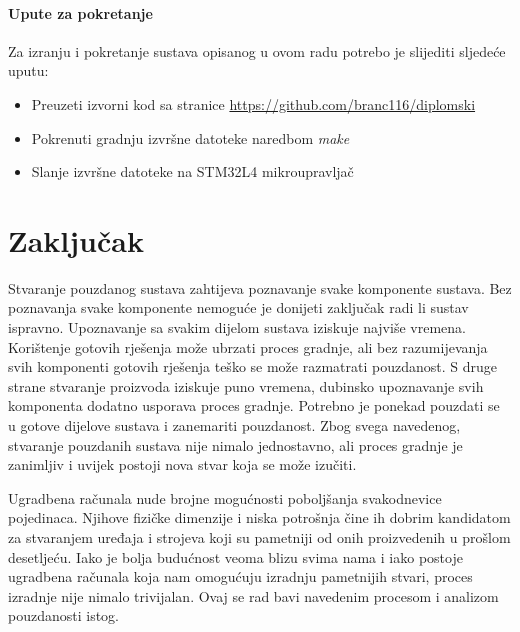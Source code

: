 \documentclass[times, utf8, diplomski]{diplomski}
\begin{document}
\subsubsection{Upute za pokretanje}
Za izranju i pokretanje sustava opisanog u ovom radu potrebo je slijediti sljedeće uputu:

\begin{itemize}
  \item Preuzeti izvorni kod sa stranice \url{https://github.com/branc116/diplomski}
  \item Pokrenuti gradnju izvršne datoteke naredbom \textit{make}
  \item Slanje izvršne datoteke na STM32L4 mikroupravljač
\end{itemize}

\chapter{Zaključak}
Stvaranje pouzdanog sustava zahtijeva poznavanje svake komponente sustava.
Bez poznavanja svake komponente nemoguće je donijeti zaključak radi li sustav ispravno.
Upoznavanje sa svakim dijelom sustava iziskuje najviše vremena.
Korištenje gotovih rješenja može ubrzati proces gradnje, ali bez razumijevanja svih komponenti gotovih rješenja teško se može razmatrati pouzdanost.
S druge strane stvaranje proizvoda iziskuje puno vremena, dubinsko upoznavanje svih komponenta dodatno usporava proces gradnje.
Potrebno je ponekad pouzdati se u gotove dijelove sustava i zanemariti pouzdanost.
Zbog svega navedenog, stvaranje pouzdanih sustava nije nimalo jednostavno, ali proces gradnje je zanimljiv i uvijek postoji nova stvar koja se može izučiti.

\nocite{*}



\listoffigures

\lstlistoflistings


\begin{sazetak}
Ugradbena računala nude brojne mogućnosti poboljšanja svakodnevice pojedinaca. Njihove fizičke dimenzije i niska potrošnja čine ih dobrim kandidatom za stvaranjem uređaja i strojeva koji su pametniji od onih proizvedenih u prošlom desetljeću. Iako je bolja budućnost veoma blizu svima nama i iako postoje ugradbena računala koja nam omogućuju izradnju pametnijih stvari, proces izradnje nije nimalo trivijalan. Ovaj se rad bavi navedenim procesom i analizom pouzdanosti istog.

\end{sazetak}
\end{document}
